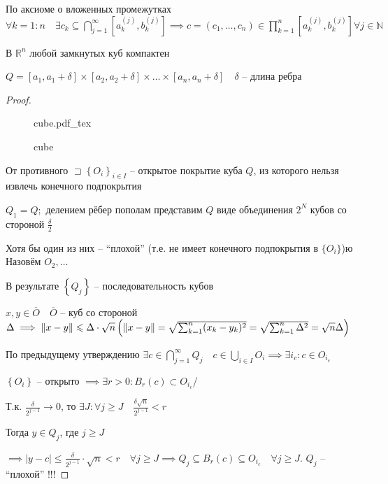 \documentclass{book}
\newcommand\N{\ensuremath{\mathbb{N}}}
\newcommand\R{\ensuremath{\mathbb{R}}}
\newcommand{\ov}[1]{\overline{#1}}
\theoremstyle{definition}
\newcommand{\incfig}[1]{%
    \def\svgwidth{\columnwidth}
    {#1.pdf_tex}
}
\begin{document}
По аксиоме о вложенных промежутках $ \forall k=1:n\quad \exists c_k \subseteq \bigcap\limits_{j=1}^{\infty } [a_k^{\left( j \right) }, b_k^{\left( j \right) }] \implies  c = \left( c_1, \ldots, c_n \right) \in \prod_{k=1}^{n} [a_k^{\left( j \right) }, b_k^{\left( j \right) } ] \forall j\in \N $

\begin{theorem}
     В $ \R^n$ любой замкнутых куб компактен 

    $Q = [a_1, a_1+\delta] \times [a_2, a_2+\delta] \times \ldots\times [a_n, a_n+\delta]\quad \delta$ -- длина ребра
\end{theorem}
\begin{proof}
\begin{figure}[ht]
    \centering
    \incfig{cube}
    \caption{cube}
    \label{fig:cube}
\end{figure}

От противного $\sqsupset \left\{ O_i \right\} _{i\in I}$ -- открытое покрытие куба $Q$, из которого нельзя извлечь конечного подпокрытия

 $Q_1 = Q;$ делением рёбер пополам представим $Q$  виде объединения  $2^N$ кубов со стороной  $\frac{\delta}{2}$ 

 Хотя бы один из них -- ``плохой'' (т.е. не имеет конечного подпокрытия в $\{O_i\}$)ю Назовём  $O_2, \ldots$

 В результате $\left\{ Q_j \right\} $ -- последовательность кубов

 $x, y\in \ov O\quad \ov O$ -- куб со стороной  $\Delta \implies  \|x-y\| \leqslant \Delta \cdot  \sqrt{n} \\ \left( \|x-y\| = \sqrt{\sum_{k=1}^{n} (x_k-y_k)^2} = \sqrt{\sum_{k=1}^{n} \Delta^2} = \sqrt{n} \Delta   \right) $

 По предыдущему утверждению $\exists c\in \bigcap\limits_{j=1}^{\infty } Q_j \quad c\in \bigcup\limits_{i \in  I} O_i \implies \exists i_c: c\in O_{i_c}$

 $\left\{ O_i \right\} $ -- открыто $\implies  \exists r>0: B_r(c)\subset O_{i_c}$/

 Т.к. $\frac{\delta}{2^{j-1}} \to 0$, то $\exists J: \forall j\geqslant J\quad \frac{\delta \sqrt{n} }{2^{j-1}}<r$ 

 Тогда $y\in Q_j$, где $j \geqslant J$

 $\implies \left| y-c \right| \leqslant \frac{\delta}{2^{j-1}}\cdot \sqrt{n}<r\quad \forall j\geqslant J\implies  Q_j\subseteq B_r(c)\subseteq O_{i_c}\quad \forall j\geqslant J $. $Q_j$ -- ``плохой'' !!!
\end{proof}
\end{document}
